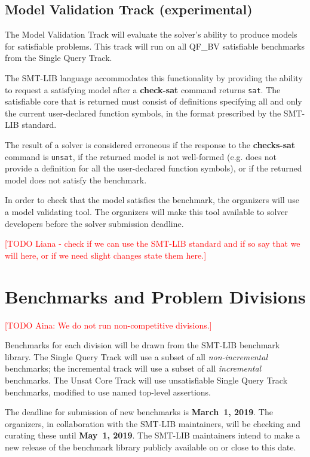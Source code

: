 \documentclass[12pt]{article}
\newcommand{\akey}[1]{\textbf{#1}}
\newcommand{\rem}[1]{\textcolor{red}{[#1]}}
\newcommand{\todo}[1]{\rem{TODO #1}}
\newcommand{\main}{Single Query\xspace}
\newcommand{\ucore}{Unsat Core\xspace}
\newcommand{\mval}{Model Validation\xspace}
\begin{document}
\subsection{\mval Track (experimental)}
\label{sec:exec:model}
The \mval Track will evaluate the solver's ability to produce models
for satisfiable problems. This track will run on all QF\_BV satisfiable benchmarks
from the \main Track.

The SMT-LIB language accommodates this functionality by providing the ability to
request a satisfying model after a \akey{check-sat} command returns \texttt{sat}.
The satisfiable core that is returned must consist of definitions specifying all
and only the current user-declared function symbols, in the format prescribed by
the SMT-LIB standard.

The result of a solver is considered erroneous if the response to the
\akey{checks-sat} command is \texttt{unsat}, if the returned model is not
well-formed (e.g. does not provide a definition for all the user-declared function
symbols), or if the returned model does not satisfy the benchmark.

In order to check that the model satisfies the benchmark, the organizers will use
a model validating tool. The organizers will make this tool available to solver
developers before the solver submission deadline.

\todo{Liana - check if we can use the SMT-LIB standard and if so say that we will here, or if we need slight changes state them here.}


\section{Benchmarks and Problem Divisions}

\todo{Aina: We do not run non-competitive divisions.}


%
Benchmarks for each division will be drawn from the SMT-LIB benchmark
library.  The \main Track will use a subset of all
\emph{non-incremental} benchmarks; the incremental track will use a
subset of all \emph{incremental} benchmarks.  The \ucore Track
will use unsatisfiable \main Track benchmarks, modified to use named
top-level assertions.


%
The deadline for submission of new benchmarks is {\bf March~1, 2019}.
The organizers, in collaboration with the SMT-LIB maintainers, will be
checking and curating these until {\bf May~1, 2019}.  The SMT-LIB
maintainers intend to make a new release of the benchmark library
publicly available on or close to this date.
\end{document}
